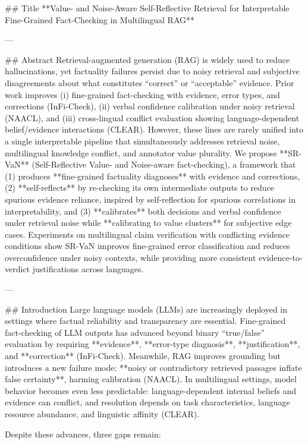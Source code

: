## Title  
**Value- and Noise-Aware Self-Reflective Retrieval for Interpretable Fine-Grained Fact-Checking in Multilingual RAG**

---

## Abstract  
Retrieval-augmented generation (RAG) is widely used to reduce hallucinations, yet factuality failures persist due to noisy retrieval and subjective disagreements about what constitutes “correct” or “acceptable” evidence. Prior work improves (i) fine-grained fact-checking with evidence, error types, and corrections (InFi-Check), (ii) verbal confidence calibration under noisy retrieval (NAACL), and (iii) cross-lingual conflict evaluation showing language-dependent belief/evidence interactions (CLEAR). However, these lines are rarely unified into a single interpretable pipeline that simultaneously addresses retrieval noise, multilingual knowledge conflict, and annotator value plurality. We propose **SR-VaN** (Self-Reflective Value- and Noise-aware fact-checking), a framework that (1) produces **fine-grained factuality diagnoses** with evidence and corrections, (2) **self-reflects** by re-checking its own intermediate outputs to reduce spurious evidence reliance, inspired by self-reflection for spurious correlations in interpretability, and (3) **calibrates** both decisions and verbal confidence under retrieval noise while **calibrating to value clusters** for subjective edge cases. Experiments on multilingual claim verification with conflicting evidence conditions show SR-VaN improves fine-grained error classification and reduces overconfidence under noisy contexts, while providing more consistent evidence-to-verdict justifications across languages.

---

## Introduction  
Large language models (LLMs) are increasingly deployed in settings where factual reliability and transparency are essential. Fine-grained fact-checking of LLM outputs has advanced beyond binary “true/false” evaluation by requiring **evidence**, **error-type diagnosis**, **justification**, and **correction** (InFi-Check). Meanwhile, RAG improves grounding but introduces a new failure mode: **noisy or contradictory retrieved passages inflate false certainty**, harming calibration (NAACL). In multilingual settings, model behavior becomes even less predictable: language-dependent internal beliefs and evidence can conflict, and resolution depends on task characteristics, language resource abundance, and linguistic affinity (CLEAR).

Despite these advances, three gaps remain:

